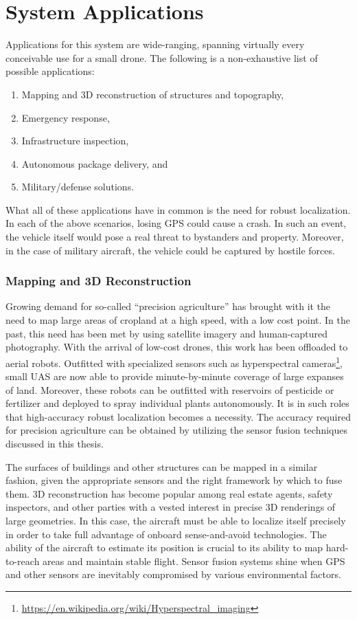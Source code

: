 \section{System Applications}

Applications for this system are wide-ranging, spanning virtually every conceivable use for a small drone. The following is a non-exhaustive list of possible applications:
\begin{enumerate}
    \item Mapping and 3D reconstruction of structures and topography,
    \item Emergency response,
    \item Infrastructure inspection,
    \item Autonomous package delivery, and
    \item Military/defense solutions.
\end{enumerate}
What all of these applications have in common is the need for robust localization. In each of the above scenarios, losing GPS could cause a crash. In such an event, the vehicle itself would pose a real threat to bystanders and property. Moreover, in the case of military aircraft, the vehicle could be captured by hostile forces.

\subsubsection{Mapping and 3D Reconstruction}

Growing demand for so-called ``precision agriculture'' has brought with it the need to map large areas of cropland at a high speed, with a low cost point. In the past, this need has been met by using satellite imagery and human-captured photography. With the arrival of low-cost drones, this work has been offloaded to aerial robots. Outfitted with specialized sensors such as hyperspectral cameras\footnote{\url{https://en.wikipedia.org/wiki/Hyperspectral_imaging}}, small UAS are now able to provide minute-by-minute coverage of large expanses of land. Moreover, these robots can be outfitted with reservoirs of pesticide or fertilizer and deployed to spray individual plants autonomously. It is in such roles that high-accuracy robust localization becomes a necessity. The accuracy required for precision agriculture can be obtained by utilizing the sensor fusion techniques discussed in this thesis.

The surfaces of buildings and other structures can be mapped in a similar fashion, given the appropriate sensors and the right framework by which to fuse them. 3D reconstruction has become popular among real estate agents, safety inspectors, and other parties with a vested interest in precise 3D renderings of large geometries. In this case, the aircraft must be able to localize itself precisely in order to take full advantage of onboard sense-and-avoid technologies. The ability of the aircraft to estimate its position is crucial to its ability to map hard-to-reach areas and maintain stable flight. Sensor fusion systems shine when GPS and other sensors are inevitably compromised by various environmental factors.

